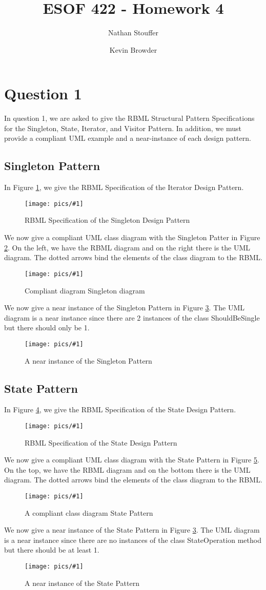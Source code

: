 \documentclass{article}
\newcommand{\fig}[3]{ 
	\begin{figure}[h]
		\centering
		\caption{#3}
		\texttt{[image: pics/\#1]}
		\label{fig:#1}
	\end{figure} 
}
\begin{document}
	\nobibliography*
\title{ESOF 422 - Homework 4}
\author{Nathan Stouffer \and Kevin Browder}

\maketitle
\newpage

\section*{Question 1}

In question 1, we are asked to give the RBML Structural Pattern Specifications for the Singleton, State, Iterator, and Visitor Pattern. In addition, we must provide a compliant UML example and a near-instance of each design pattern.

\subsection*{Singleton Pattern}

In Figure \ref{fig:singleton-rbml}, we give the RBML Specification of the Iterator Design Pattern.

\fig{singleton-rbml}{.4}{RBML Specification of the Singleton Design Pattern}

We now give a compliant UML class diagram with the Singleton Patter in Figure \ref{fig:singleton-inst}. On the left, we have the RBML diagram and on the right there is the UML diagram. The dotted arrows bind the elements of the class diagram to the RBML.

\fig{singleton-inst}{0.75}{Compliant diagram Singleton diagram}

We now give a near instance of the Singleton Pattern in Figure \ref{fig:singleton-ninst}. The UML diagram is a near instance since there are 2 instances of the class ShouldBeSingle but there should only be 1.

\fig{singleton-ninst}{0.5}{A near instance of the Singleton Pattern}
\newpage

\subsection*{State Pattern}
In Figure \ref{fig:state-rbml}, we give the RBML Specification of the State Design Pattern.

\fig{state-rbml}{.95}{RBML Specification of the State Design Pattern}

We now give a compliant UML class diagram with the State Pattern in Figure \ref{fig:state-inst}. On the top, we have the RBML diagram and on the bottom there is the UML diagram. The dotted arrows bind the elements of the class diagram to the RBML.
\fig{state-inst}{.75}{A compliant class diagram State Pattern}
\newpage
We now give a near instance of the State Pattern in Figure \ref{fig:singleton-ninst}. The UML diagram is a near instance since there are no instances of the class StateOperation method but there should be at least 1.
\fig{state-ninst}{.75}{A near instance of the State Pattern}
\newpage
\end{document}
